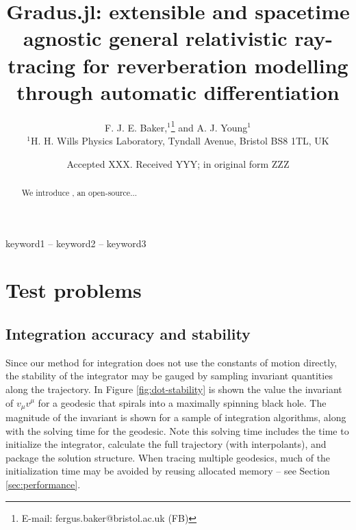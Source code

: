 \documentclass[fleqn,usenatbib]{mnras}
\title[Gradus.jl]{Gradus.jl: extensible and spacetime agnostic general relativistic ray-tracing for reverberation modelling through automatic differentiation}
\author[F. J. E. Baker et al.]{
F. J. E. Baker,$^{1}$\thanks{E-mail: fergus.baker@bristol.ac.uk (FB)}
and A. J. Young$^{1}$
\\
$^{1}$H. H. Wills Physics Laboratory, Tyndall Avenue, Bristol BS8 1TL, UK
}
\date{Accepted XXX. Received YYY; in original form ZZZ}
\begin{document}
\label{firstpage}
\pagerange{\pageref{firstpage}--\pageref{lastpage}}
\maketitle

\begin{abstract}
	We introduce \Gradus, an open-source...
\end{abstract}

\begin{keywords}
keyword1 -- keyword2 -- keyword3
\end{keywords}









\section{Test problems}


\subsection{Integration accuracy and stability}

Since our method for integration does not use the constants of motion directly, the stability of the integrator may be gauged by sampling invariant quantities along the trajectory. In Figure \ref{fig:dot-stability} is shown the value the invariant of $v_\mu v^\mu$ for a geodesic that spirals into a maximally spinning black hole. The magnitude of the invariant is shown for a sample of integration algorithms, along with the solving time for the geodesic. Note this solving time includes the time to initialize the integrator, calculate the full trajectory (with interpolants), and package the solution structure. When tracing multiple geodesics, much of the initialization time may be avoided by reusing allocated memory -- see Section \ref{sec:performance}.
\end{document}
